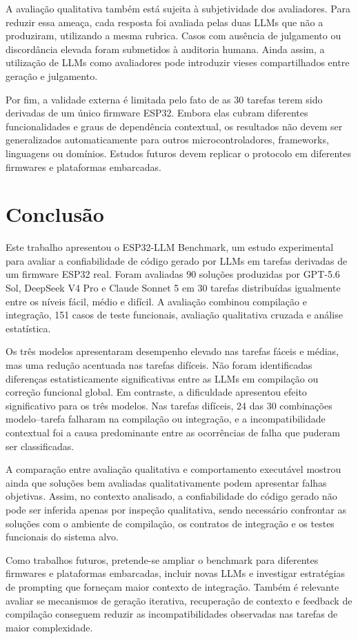 \documentclass[12pt]{article}
\begin{document}
A avaliação qualitativa também está sujeita à subjetividade dos avaliadores. Para reduzir essa ameaça, cada resposta foi avaliada pelas duas LLMs que não a produziram, utilizando a mesma rubrica. Casos com ausência de julgamento ou discordância elevada foram submetidos à auditoria humana. Ainda assim, a utilização de LLMs como avaliadores pode introduzir vieses compartilhados entre geração e julgamento.

Por fim, a validade externa é limitada pelo fato de as 30 tarefas terem sido derivadas de um único firmware ESP32. Embora elas cubram diferentes funcionalidades e graus de dependência contextual, os resultados não devem ser generalizados automaticamente para outros microcontroladores, frameworks, linguagens ou domínios. Estudos futuros devem replicar o protocolo em diferentes firmwares e plataformas embarcadas.

\section{Conclusão}
\label{sec:conclusao}

Este trabalho apresentou o ESP32-LLM Benchmark, um estudo experimental para avaliar a confiabilidade de código gerado por LLMs em tarefas derivadas de um firmware ESP32 real. Foram avaliadas 90 soluções produzidas por GPT-5.6 Sol, DeepSeek V4 Pro e Claude Sonnet 5 em 30 tarefas distribuídas igualmente entre os níveis fácil, médio e difícil. A avaliação combinou compilação e integração, 151 casos de teste funcionais, avaliação qualitativa cruzada e análise estatística.

Os três modelos apresentaram desempenho elevado nas tarefas fáceis e médias, mas uma redução acentuada nas tarefas difíceis. Não foram identificadas diferenças estatisticamente significativas entre as LLMs em compilação ou correção funcional global. Em contraste, a dificuldade apresentou efeito significativo para os três modelos. Nas tarefas difíceis, 24 das 30 combinações modelo--tarefa falharam na compilação ou integração, e a incompatibilidade contextual foi a causa predominante entre as ocorrências de falha que puderam ser classificadas.

A comparação entre avaliação qualitativa e comportamento executável mostrou ainda que soluções bem avaliadas qualitativamente podem apresentar falhas objetivas. Assim, no contexto analisado, a confiabilidade do código gerado não pode ser inferida apenas por inspeção qualitativa, sendo necessário confrontar as soluções com o ambiente de compilação, os contratos de integração e os testes funcionais do sistema alvo.

Como trabalhos futuros, pretende-se ampliar o benchmark para diferentes firmwares e plataformas embarcadas, incluir novas LLMs e investigar estratégias de prompting que forneçam maior contexto de integração. Também é relevante avaliar se mecanismos de geração iterativa, recuperação de contexto e feedback de compilação conseguem reduzir as incompatibilidades observadas nas tarefas de maior complexidade.



\end{document}
